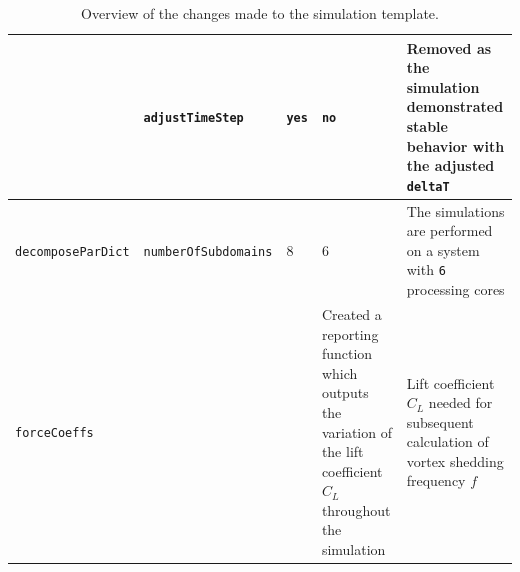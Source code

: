 \begin{table}[H]
{\begin{tabularx}{1.2\textwidth}{|p{3cm}|p{3.3cm}|p{2.8cm}|p{3cm}|X|}
			\rule{0pt}{5ex} & {\small\verb*|adjustTimeStep|} & \verb*|yes| & \verb*|no| &
			 Removed as the simulation demonstrated stable behavior with the adjusted \verb*|deltaT| \parencite{jayaraj2024openfoam}
			 \\ 
			
			\hline
			
			{\footnotesize\verb*|decomposeParDict|} & {\footnotesize\verb*|numberOfSubdomains|} & 8 & 6 & The simulations are performed on a system with \verb*|6| processing cores \parencite{jayaraj2024openfoam} \\
			\hline
			
			\verb*|forceCoeffs| & \textemdash & \textemdash & Created a reporting function which outputs the variation of the lift coefficient $C_L$ throughout the simulation & Lift coefficient $C_L$ needed for subsequent calculation of vortex shedding frequency $f$\\
			\hline
			

		\end{tabularx}
	}
	\caption{Overview of the changes made to the simulation template.}
	\label{tab:simulation_change1}
\end{table}

\begin{table}[H]
	\centering
	\renewcommand{\arraystretch}{1.3}
	\caption*{Table 1 (continued): Overview of the changes made to the simulation template.}
	\label{tab:simulation_changes2}

\end{table}


